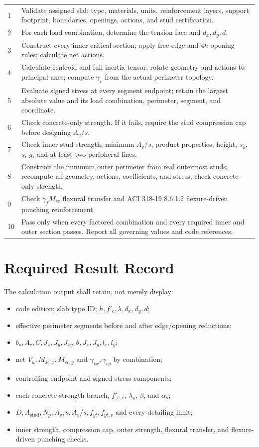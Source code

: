 \documentclass[10pt]{article}
\begin{document}
{\small
\begin{tabularx}{\linewidth}{@{}p{0.28in}X@{}}
\toprule
1 & Validate assigned slab type, materials, units, reinforcement layers,
support footprint, boundaries, openings, actions, and stud certification. \\
2 & For each load combination, determine the tension face and $d_x,d_y,d$. \\
3 & Construct every inner critical section; apply free-edge and $4h$ opening
rules; calculate net actions. \\
4 & Calculate centroid and full inertia tensor; rotate geometry and actions to
principal axes; compute $\gamma_v$ from the actual perimeter topology. \\
5 & Evaluate signed stress at every segment endpoint; retain the largest
absolute value and its load combination, perimeter, segment, and coordinate. \\
6 & Check concrete-only strength. If it fails, require the stud compression cap
before designing $A_v/s$. \\
7 & Check inner stud strength, minimum $A_v/s$, product properties, height,
$s_o$, $s$, $g$, and at least two peripheral lines. \\
8 & Construct the minimum outer perimeter from real outermost studs; recompute
all geometry, actions, coefficients, and stress; check concrete-only strength. \\
9 & Check $\gamma_fM_{sc}$ flexural transfer and ACI 318-19 8.6.1.2
flexure-driven punching reinforcement. \\
10 & Pass only when every factored combination and every required inner and
outer section passes. Report all governing values and code references. \\
\bottomrule
\end{tabularx}
}

\section{Required Result Record}

The calculation output shall retain, not merely display:
\begin{itemize}
\setlength\itemsep{0pt}
\item code edition; slab type ID; $h,f'_c,\lambda,d_x,d_y,d$;
\item effective perimeter segments before and after edge/opening reductions;
\item $b_o,A_c,C,J_{\bar x},J_{\bar y},J_{\bar x\bar y},\theta,J_x,J_y,l_x,l_y$;
\item net $V_u,M_{sc,x},M_{sc,y}$ and $\gamma_{vx},\gamma_{vy}$ by combination;
\item controlling endpoint and signed stress components;
\item each concrete-strength branch, $f'_{c,v}$, $\lambda_s$, $\beta$, and
$\alpha_s$;
\item $D,A_{\mathrm{stud}},N_p,A_v,s,A_v/s,f_{yt},f_{yt,v}$ and every detailing
limit;
\item inner strength, compression cap, outer strength, flexural transfer, and
flexure-driven punching checks.
\end{itemize}
\end{document}
